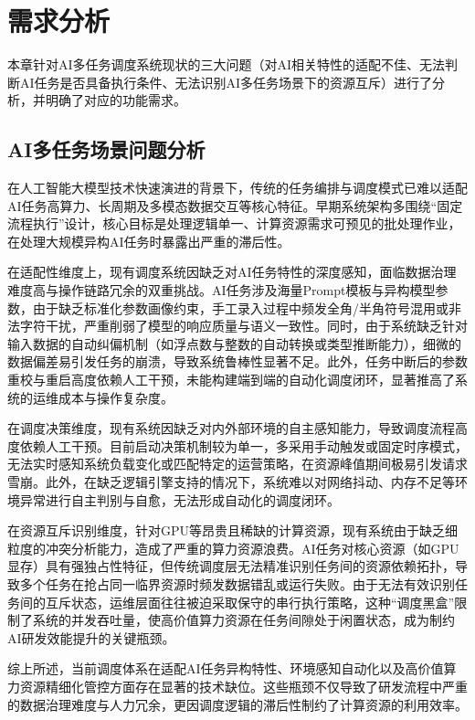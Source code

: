 \chapter{需求分析}

本章针对AI多任务调度系统现状的三大问题（对AI相关特性的适配不佳、无法判断AI任务是否具备执行条件、无法识别AI多任务场景下的资源互斥）进行了分析，并明确了对应的功能需求。

\section{AI多任务场景问题分析}

在人工智能大模型技术快速演进的背景下，传统的任务编排与调度模式已难以适配AI任务高算力、长周期及多模态数据交互等核心特征。早期系统架构多围绕“固定流程执行”设计，核心目标是处理逻辑单一、计算资源需求可预见的批处理作业，在处理大规模异构AI任务时暴露出严重的滞后性。

在适配性维度上，现有调度系统因缺乏对AI任务特性的深度感知，面临数据治理难度高与操作链路冗余的双重挑战。AI任务涉及海量Prompt模板与异构模型参数，由于缺乏标准化参数画像约束，手工录入过程中频发全角/半角符号混用或非法字符干扰，严重削弱了模型的响应质量与语义一致性。同时，由于系统缺乏针对输入数据的自动纠偏机制（如浮点数与整数的自动转换或类型推断能力），细微的数据偏差易引发任务的崩溃，导致系统鲁棒性显著不足。此外，任务中断后的参数重校与重启高度依赖人工干预，未能构建端到端的自动化调度闭环，显著推高了系统的运维成本与操作复杂度。

在调度决策维度，现有系统因缺乏对内外部环境的自主感知能力，导致调度流程高度依赖人工干预。目前启动决策机制较为单一，多采用手动触发或固定时序模式，无法实时感知系统负载变化或匹配特定的运营策略，在资源峰值期间极易引发请求雪崩。此外，在缺乏逻辑引擎支持的情况下，系统难以对网络抖动、内存不足等环境异常进行自主判别与自愈，无法形成自动化的调度闭环。

在资源互斥识别维度，针对GPU等昂贵且稀缺的计算资源，现有系统由于缺乏细粒度的冲突分析能力，造成了严重的算力资源浪费。AI任务对核心资源（如GPU显存）具有强独占性特征，但传统调度层无法精准识别任务间的资源依赖拓扑，导致多个任务在抢占同一临界资源时频发数据错乱或运行失败。由于无法有效识别任务间的互斥状态，运维层面往往被迫采取保守的串行执行策略，这种“调度黑盒”限制了系统的并发吞吐量，使高价值算力资源在任务间隙处于闲置状态，成为制约AI研发效能提升的关键瓶颈。

综上所述，当前调度体系在适配AI任务异构特性、环境感知自动化以及高价值算力资源精细化管控方面存在显著的技术缺位。这些瓶颈不仅导致了研发流程中严重的数据治理难度与人力冗余，更因调度逻辑的滞后性制约了计算资源的利用效率。

